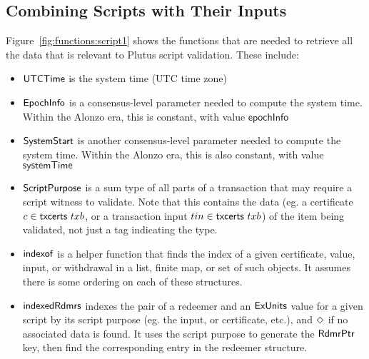 \subsection{Combining Scripts with Their Inputs}
\label{sec:scripts-inputs}

Figure~\ref{fig:functions:script1} shows the functions that are needed to
retrieve all the data that is relevant to Plutus script validation.
These include:

\begin{itemize}
\item $\mathsf{UTCTime}$ is the system time (UTC time zone)
\item $\mathsf{EpochInfo}$ is a consensus-level parameter needed to compute the system time. Within
the Alonzo era, this is constant, with value $\mathsf{epochInfo}$
\item $\mathsf{SystemStart}$ is another consensus-level parameter needed to compute the system time. Within
the Alonzo era, this is also constant, with value $\mathsf{systemTime}$
\item
  $\mathsf{ScriptPurpose}$ is a sum type of all parts of a transaction that may
  require a script witness to validate. Note that this contains the data
  (eg. a certificate $c \in \mathsf{txcerts}~{txb}$,
  or a transaction input $tin \in \mathsf{txcerts}~{txb}$) of the item being validated,
  not just a tag indicating the type.
\item
  $\mathsf{indexof}$ is a helper function that finds the index of a given certificate, value, input, or
  withdrawal in a list, finite map, or set of such objects.
  It assumes there is some ordering on each of these structures.
\item
  $\mathsf{indexedRdmrs}$ indexes the pair of a redeemer and an $\mathsf{ExUnits}$ value
  for a given script by its script purpose (eg. the input, or certificate, etc.),
  and $\Diamond$ if no associated data is found.
  It uses the script purpose to generate the $\mathsf{RdmrPtr}$ key,
  then find the corresponding entry in the redeemer structure.
\end{itemize}


